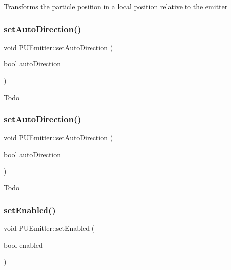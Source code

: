 Transforms the particle position in a local position relative to the emitter \mbox{\label{classPUEmitter_a063a09ad3ae10313e1f87555798ec362}} 
\subsubsection{\texorpdfstring{set\+Auto\+Direction()}{setAutoDirection()}\hspace{0.1cm}{\footnotesize\ttfamily [1/2]}}
{\footnotesize\ttfamily void P\+U\+Emitter\+::set\+Auto\+Direction (\begin{DoxyParamCaption}\item[{bool}]{auto\+Direction }\end{DoxyParamCaption})}

Todo \mbox{\label{classPUEmitter_a063a09ad3ae10313e1f87555798ec362}} 
\subsubsection{\texorpdfstring{set\+Auto\+Direction()}{setAutoDirection()}\hspace{0.1cm}{\footnotesize\ttfamily [2/2]}}
{\footnotesize\ttfamily void P\+U\+Emitter\+::set\+Auto\+Direction (\begin{DoxyParamCaption}\item[{bool}]{auto\+Direction }\end{DoxyParamCaption})}

Todo \mbox{\label{classPUEmitter_a4f257171b370033d2ca3544867912645}} 
\subsubsection{\texorpdfstring{set\+Enabled()}{setEnabled()}\hspace{0.1cm}{\footnotesize\ttfamily [1/2]}}
{\footnotesize\ttfamily void P\+U\+Emitter\+::set\+Enabled (\begin{DoxyParamCaption}\item[{bool}]{enabled }\end{DoxyParamCaption})}

